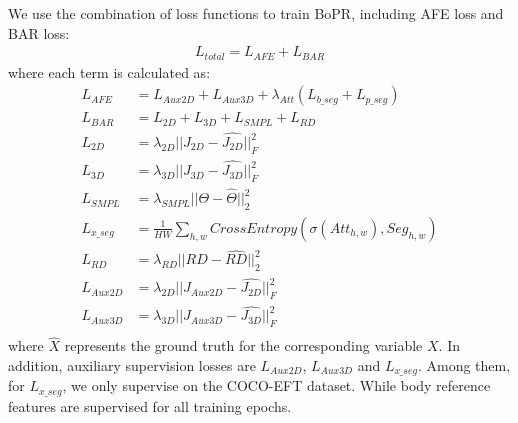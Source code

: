 \documentclass[10pt,twocolumn,letterpaper]{article}
\begin{document}
We use the combination of loss functions to train BoPR, including AFE loss and BAR loss:
\begin{equation}
\begin{aligned}
L_{total} = L_{AFE}+L_{BAR}
\end{aligned}
\end{equation}
where each term is calculated as:
\begin{equation}
\begin{aligned}
L_{AFE} &= L_{Aux2D}\!+\!L_{Aux3D}\!+\!\lambda_{Att}(L_{b\_seg}\!+\!L_{p\_seg})\\
L_{BAR} &= L_{2D}+L_{3D}+L_{SMPL}+L_{RD}\\
L_{2D} &= \lambda_{2D}||J_{2D}-\hat{J_{2D}}||_{F}^{2}\\
L_{3D} &= \lambda_{3D}||J_{3D}-\hat{J_{3D}}||_{F}^{2}\\
L_{SMPL} &= \lambda_{SMPL}||\Theta-\hat{\Theta}||_{2}^{2}\\
L_{x\_seg} &= \!\frac{1}{HW}\!\sum\limits_{h,w}\limits^{}\!CrossEntropy\!(\!\sigma(Att_{h,w})\!,\!{Seg_{h,w}}\!)\\
L_{RD} &=\lambda_{RD}||RD-\hat{RD}||_{2}^{2}\\
L_{Aux2D} &= \lambda_{2D}||J_{Aux2D}-\hat{J_{2D}}||_{F}^{2}\\
L_{Aux3D} &= \lambda_{3D}||J_{Aux3D}-\hat{J_{3D}}||_{F}^{2}\\
\end{aligned}
\end{equation}
where $\hat{X}$ represents the ground truth for the corresponding variable $X$. In addition, auxiliary supervision losses are $L_{Aux2D}$, $L_{Aux3D}$ and $L_{x\_seg}$. Among them, for $L_{x\_seg}$, we only supervise on the COCO-EFT dataset. While body reference features are supervised for all training epochs.
\end{document}
